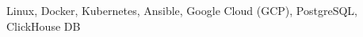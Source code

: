 \item[Technologies:] Linux, Docker, Kubernetes, Ansible, Google Cloud (GCP), PostgreSQL, ClickHouse DB